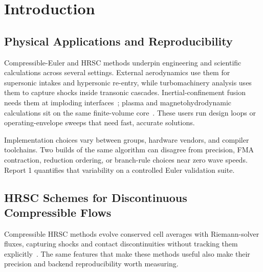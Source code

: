 
\chapter{Introduction}

\section{Physical Applications and Reproducibility}
Compressible-Euler and HRSC methods underpin engineering and scientific calculations across several settings. External aerodynamics use them for supersonic intakes and hypersonic re-entry, while turbomachinery analysis uses them to capture shocks inside transonic cascades. Inertial-confinement fusion needs them at imploding interfaces~\citep{atzeni_meyer_2004}; plasma and magnetohydrodynamic calculations sit on the same finite-volume core~\citep{bard_dorelli_2014}. These users run design loops or operating-envelope sweeps that need fast, accurate solutions.

%

Implementation choices vary between groups, hardware vendors, and compiler toolchains. Two builds of the same algorithm can disagree from precision, FMA contraction, reduction ordering, or branch-rule choices near zero wave speeds. Report 1 quantifies that variability on a controlled Euler validation suite.

\section{HRSC Schemes for Discontinuous Compressible Flows}
Compressible HRSC methods evolve conserved cell averages with Riemann-solver fluxes, capturing shocks and contact discontinuities without tracking them explicitly~\citep{toro2009}. The same features that make these methods useful also make their precision and backend reproducibility worth measuring.

